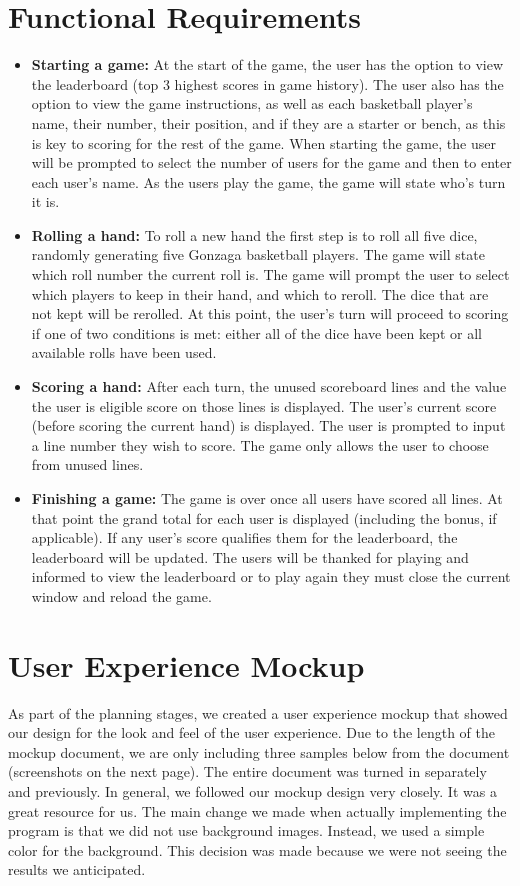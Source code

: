 \documentclass[]{report}   %
\begin{document}
\begin{itemize}
\end{itemize}

\section{Functional Requirements}     %
\begin{itemize}
\item \textbf{Starting a game:}
At the start of the game, the user has the option to view the leaderboard (top 3 highest scores in game history). The user also has the option to view the game instructions, as well as each basketball player's name, their number, their position, and if they are a starter or bench, as this is key to scoring for the rest of the game. When starting the game, the user will be prompted to select the number of users for the game and then to enter each user's name. As the users play the game, the game will state who's turn it is.
\item \textbf{Rolling a hand:}
	To roll a new hand the first step is to roll all five dice, randomly generating five Gonzaga basketball players. The game will state which roll number the current roll is. The game will prompt the user to select which players to keep in their hand, and which to reroll. The dice that are not kept will be rerolled. At this point, the user's turn will proceed to scoring if one of two conditions is met: either all of the dice have been kept or all available rolls have been used. 
\item \textbf{Scoring a hand:}
	After each turn, the unused scoreboard lines and the value the user is eligible score on those lines is displayed. The user's current score (before scoring the current hand) is displayed. The user is prompted to input a line number they wish to score. The game only allows the user to choose from unused lines. 
\item \textbf{Finishing a game:}
	The game is over once all users have scored all lines. At that point the grand total for each user is displayed (including the bonus, if applicable). If any user's score qualifies them for the leaderboard, the leaderboard will be updated. The users will be thanked for playing and informed to view the leaderboard or to play again they must close the current window and reload the game.
\end{itemize}

\section{User Experience Mockup}     %
As part of the planning stages, we created a user experience mockup that showed our design for the look and feel of the user experience. Due to the length of the mockup document, we are only including three samples below from the document (screenshots on the next page). The entire document was turned in separately and previously. In general, we followed our mockup design very closely. It was a great resource for us. The main change we made when actually implementing the program is that we did not use background images. Instead, we used a simple color for the background. This decision was made because we were not seeing the results we anticipated.
\end{document}
